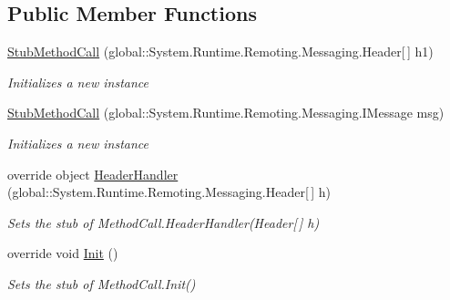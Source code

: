 \subsection*{Public Member Functions}
\begin{DoxyCompactItemize}
\item 
\hyperlink{class_system_1_1_runtime_1_1_remoting_1_1_messaging_1_1_fakes_1_1_stub_method_call_af59e3f37d2991f48537b46262b37fbe1}{Stub\-Method\-Call} (global\-::\-System.\-Runtime.\-Remoting.\-Messaging.\-Header\mbox{[}$\,$\mbox{]} h1)
\begin{DoxyCompactList}\small\item\em Initializes a new instance\end{DoxyCompactList}\item 
\hyperlink{class_system_1_1_runtime_1_1_remoting_1_1_messaging_1_1_fakes_1_1_stub_method_call_ac80dfa98fd932621759c62aa97541598}{Stub\-Method\-Call} (global\-::\-System.\-Runtime.\-Remoting.\-Messaging.\-I\-Message msg)
\begin{DoxyCompactList}\small\item\em Initializes a new instance\end{DoxyCompactList}\item 
override object \hyperlink{class_system_1_1_runtime_1_1_remoting_1_1_messaging_1_1_fakes_1_1_stub_method_call_a63058b558c2142b536b5928242fb87f1}{Header\-Handler} (global\-::\-System.\-Runtime.\-Remoting.\-Messaging.\-Header\mbox{[}$\,$\mbox{]} h)
\begin{DoxyCompactList}\small\item\em Sets the stub of Method\-Call.\-Header\-Handler(\-Header\mbox{[}$\,$\mbox{]} h)\end{DoxyCompactList}\item 
override void \hyperlink{class_system_1_1_runtime_1_1_remoting_1_1_messaging_1_1_fakes_1_1_stub_method_call_af331a367b145562236637475dfc586b6}{Init} ()
\begin{DoxyCompactList}\small\item\em Sets the stub of Method\-Call.\-Init()\end{DoxyCompactList}\end{DoxyCompactItemize}
